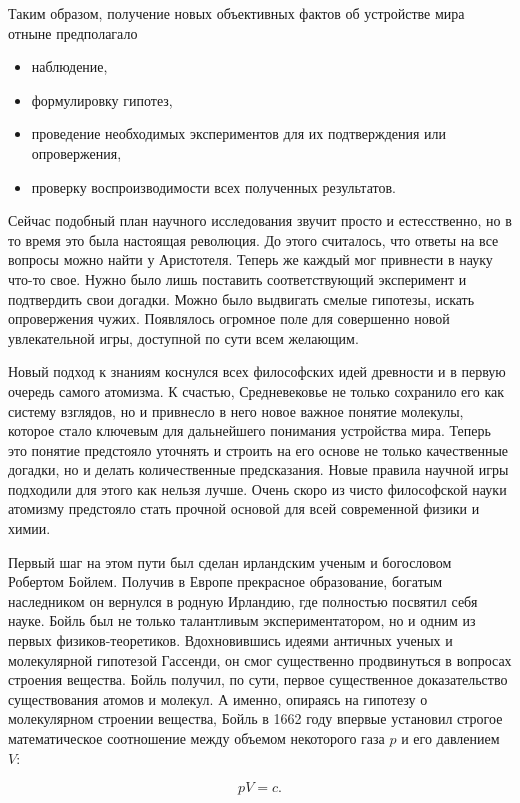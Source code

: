 Таким образом, получение новых объективных фактов об устройстве мира отныне предполагало 
\begin{itemize}
    \item наблюдение,
    \item формулировку гипотез,
    \item проведение необходимых экспериментов для их подтверждения или опровержения,
    \item проверку воспроизводимости всех полученных результатов.
\end{itemize}
Сейчас подобный план научного исследования звучит просто и естесственно, но в то время это была настоящая революция.
До этого считалось, что ответы на все вопросы можно найти у Аристотеля.
Теперь же каждый мог привнести в науку что-то свое.
Нужно было лишь поставить соответствующий эксперимент и подтвердить свои догадки.
Можно было выдвигать смелые гипотезы, искать опровержения чужих.
Появлялось огромное поле для совершенно новой увлекательной игры, доступной по сути всем желающим.

Новый подход к знаниям коснулся всех философских идей древности и в первую очередь самого атомизма.
К счастью, Средневековье не только сохранило его как систему взглядов, но и привнесло в него новое важное понятие молекулы, которое стало ключевым для дальнейшего понимания устройства мира. 
Теперь это понятие предстояло уточнять и строить на его основе не только качественные догадки, но и делать количественные предсказания.
Новые правила научной игры подходили для этого как нельзя лучше.
Очень скоро из чисто философской науки атомизму предстояло стать прочной основой для всей современной физики и химии.

Первый шаг на этом пути был сделан ирландским ученым и богословом Робертом Бойлем.
Получив в Европе прекрасное образование, богатым наследником он вернулся в родную Ирландию, где полностью посвятил себя науке.
Бойль был не только талантливым экспериментатором, но и одним из первых физиков-теоретиков.
Вдохновившись идеями античных ученых и молекулярной гипотезой Гассенди, он смог существенно продвинуться в вопросах строения вещества. Бойль получил, по сути, первое существенное доказательство существования атомов и молекул.
А именно, опираясь на гипотезу о молекулярном строении вещества, Бойль в 1662 году впервые установил строгое математическое соотношение между объемом некоторого газа $p$ и его давлением $V$:

\begin{equation}\label{eq:boil}
pV = c.
\end{equation}

